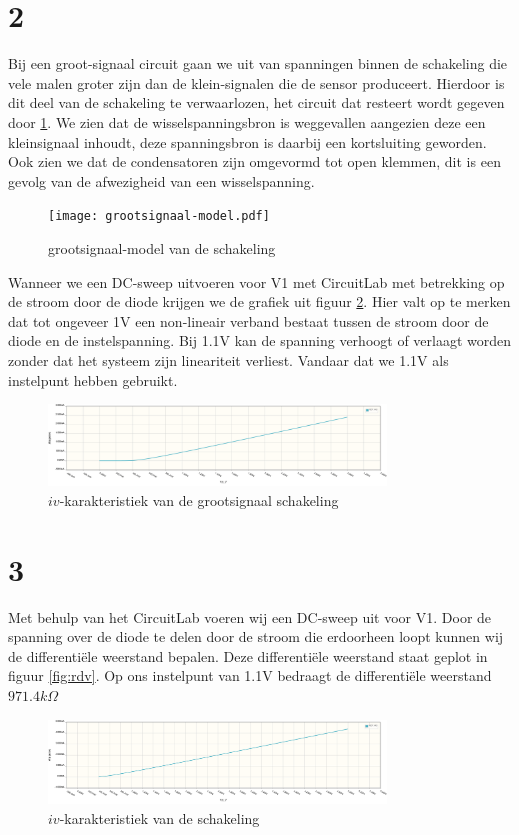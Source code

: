 \documentclass{report}
\begin{document}
\section{2}
Bij een groot-signaal circuit gaan we uit van spanningen binnen de schakeling die vele malen groter zijn dan de klein-signalen die de sensor produceert. Hierdoor is dit deel van de schakeling te verwaarlozen, het circuit dat resteert wordt gegeven door \ref{fig:groot}.
We zien dat de wisselspanningsbron is weggevallen aangezien deze een kleinsignaal inhoudt, deze spanningsbron is daarbij een kortsluiting geworden. Ook zien we dat de condensatoren zijn omgevormd tot open klemmen, dit is een gevolg van de afwezigheid van een wisselspanning.
\begin{figure}[H]
	\centering
	\texttt{[image: grootsignaal-model.pdf]}
	\caption{grootsignaal-model van de schakeling}
	\label{fig:groot}
\end{figure}

\noindent Wanneer we een DC-sweep uitvoeren voor V1 met CircuitLab met betrekking op de stroom door de diode krijgen we de grafiek uit figuur \ref{fig:iv-groot}. Hier valt op te merken dat tot ongeveer 1V een non-lineair verband bestaat tussen de stroom door de diode en de instelspanning. Bij 1.1V kan de spanning verhoogt of verlaagt worden zonder dat het systeem zijn lineariteit verliest. Vandaar dat we 1.1V als instelpunt hebben gebruikt.

\begin{figure}[H]
	\centering
	\includegraphics[width=0.8\textwidth]{iv-groot.png}
	\caption{$iv$-karakteristiek van de grootsignaal schakeling}
	\label{fig:iv-groot}
\end{figure}


\section{3}
Met behulp van het CircuitLab voeren wij een DC-sweep uit voor V1. Door de spanning over de diode te delen door de stroom die erdoorheen loopt kunnen wij de differentiële weerstand bepalen. Deze differentiële weerstand staat geplot in figuur \ref{fig:rdv}. Op ons instelpunt van 1.1V bedraagt de differentiële weerstand $971.4k\Omega$
\begin{figure}[H] 
	\centering
	\includegraphics[width=0.8\textwidth]{iv.png}
	\caption{$iv$-karakteristiek van de schakeling}
	\label{fig:iv}
\end{figure}
\end{document}
